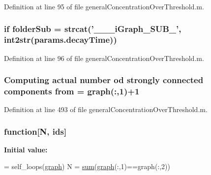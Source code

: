 Definition at line 95 of file general\+Concentration\+Over\+Threshold.\+m.

\hypertarget{a00028_a05c5bf0305e5d58d4dc25bd89a025678}{
\subsubsection[{folder\+Sub}]{ {\bf if} folder\+Sub = strcat('\+\_\+\+\_\+\_\+i\+Graph\+\_\+\+S\+U\+B\+\_\+', int2str({\bf params.\+decay\+Time}))}}\label{a00028_a05c5bf0305e5d58d4dc25bd89a025678}


Definition at line 96 of file general\+Concentration\+Over\+Threshold.\+m.

\hypertarget{a00028_aa7b4fe13e75a69fca72862effeaf6196}{
\subsubsection[{from}]{\setlength{\rightskip}{0pt plus 5cm}Computing actual number od strongly connected components from = {\bf graph}(\+:,1)+1}}\label{a00028_aa7b4fe13e75a69fca72862effeaf6196}


Definition at line 493 of file general\+Concentration\+Over\+Threshold.\+m.

\hypertarget{a00028_af12e4ac3392d0671e386d46e2424a06a}{
\subsubsection[{function}]{ function\mbox{[}N, {\bf ids}\mbox{]}}}\label{a00028_af12e4ac3392d0671e386d46e2424a06a}
{\bfseries Initial value\+:}
\begin{DoxyCode}
= self\_loops(\hyperlink{a00028_a91819eaefb434ac459f17b3caa03713d}{graph})
    N = \hyperlink{a00028_a576bebae86b11914280920c448def53d}{sum}(\hyperlink{a00028_a91819eaefb434ac459f17b3caa03713d}{graph}(:,1)==graph(:,2))
\end{DoxyCode}


